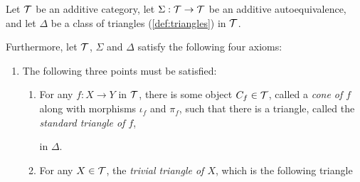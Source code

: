 \begin{definition}
    \label{def:triangulated_category}
    Let \( {\mathcal{T}} \) be an additive category, let \( \Sigma: {\mathcal{T}} \to {\mathcal{T}} \) be an additive autoequivalence, and let \( \Delta \) be a class of triangles (\autoref{def:triangles}) in \( {\mathcal{T}} \).

    Furthermore, let \( {\mathcal{T}} \), \( \Sigma \) and \( \Delta \) satisfy the following four axioms:
    \begin{enumerate}[label={(\bfseries T\arabic*)}]
        \item {
            The following three points must be satisfied:
            \begin{enumerate}
                \item {
                    For any \( f: X \to Y \) in \( {\mathcal{T}} \), there is some object \( C_f \in {\mathcal{T}} \), called a \emph{cone of \( f \)} along with morphisms \( \iota_f \) and \( \pi_f \), such that there is a triangle, called the \emph{standard triangle of \( f \)},
                    \begin{center}
                    \end{center}
                    in \( \Delta \).
                }
                \item {
                    For any \( X \in {\mathcal{T}} \), the \emph{trivial triangle of \( X \)}, which is the following triangle
                    \begin{center}
\end{center}}
\end{enumerate}}
\end{enumerate}
\end{definition}
